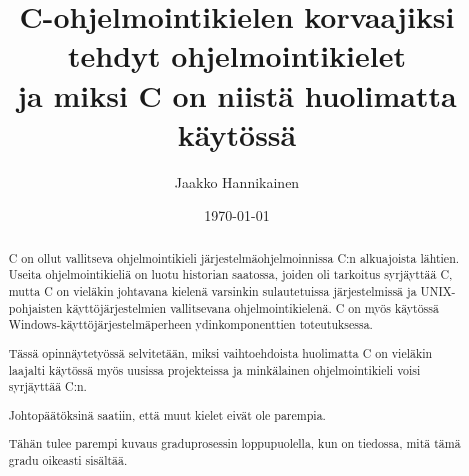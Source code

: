 \documentclass[gradu]{tktltiki}
\begin{document}
\title{C-ohjelmointikielen korvaajiksi tehdyt ohjelmointikielet \\
ja miksi C on niistä huolimatta käytössä}
\gdef\formtitle{C-ohjelmointikielen korvaajiksi tehdyt ohjelmointikielet
ja miksi C on niistä huolimatta käytössä}
\author{Jaakko Hannikainen}
\date{\today}

\maketitle



\begin{abstract}
    C on ollut vallitseva ohjelmointikieli järjestelmäohjelmoinnissa C:n
    alkuajoista lähtien. Useita ohjelmointikieliä on luotu historian saatossa,
    joiden oli tarkoitus syrjäyttää C, mutta C on vieläkin johtavana kielenä
    varsinkin sulautetuissa järjestelmissä ja UNIX-pohjaisten
    käyttöjärjestelmien vallitsevana ohjelmointikielenä. C on myös käytössä
    Windows-käyttöjärjestelmäperheen ydinkomponenttien toteutuksessa.

    Tässä opinnäytetyössä selvitetään, miksi vaihtoehdoista huolimatta C on vieläkin
    laajalti käytössä myös uusissa projekteissa ja minkälainen ohjelmointikieli
    voisi syrjäyttää C:n.

    Johtopäätöksinä saatiin, että muut kielet eivät ole parempia.

    Tähän tulee parempi kuvaus graduprosessin loppupuolella, kun on
    tiedossa, mitä tämä gradu oikeasti sisältää.
\end{abstract}

\newpage
\tocbeginshere

\mytableofcontents


\newpage

\newpage

\newpage

\newpage

\newpage

%


\appendixbeginhere
%
\appendixendhere
\end{document}
